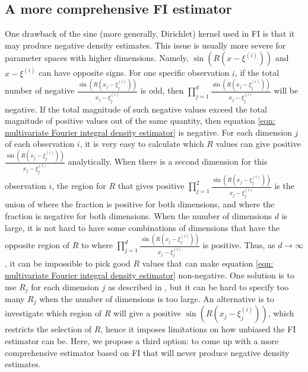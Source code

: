 \documentclass[%
 reprint,
 amsmath,amssymb,
 aps,
]{revtex4-2}
\begin{document}
\subsection{\label{subsec:comprehensive FI} A more comprehensive FI estimator}

One drawback of the sine (more generally, Dirichlet) kernel used in FI is that it may produce negative density estimates. This issue is usually more severe for parameter spaces with higher dimensions. Namely, $\sin(R(x - \xi^{(i)}))$ and $x - \xi^{(i)}$ can have opposite signs. For one specific observation $i$, if the total number of negative $\displaystyle \frac{\sin(R(x_j - \xi_j^{(i)}))}{x_j - \xi_j^{(i)}}$ is odd, then $\displaystyle \prod_{j = 1}^d \frac{\sin(R(x_j - \xi_j^{(i)}))}{x_j - \xi_j^{(i)}}$ will be negative. If the total magnitude of such negative values exceed the total magnitude of positive values out of the same quantity, then equation \eqref{eqn: multivariate Fourier integral density estimator} is negative. For each dimension $j$ of each observation $i$, it is very easy to calculate which $R$ values can give positive $\displaystyle \frac{\sin(R(x_j - \xi_j^{(i)}))}{x_j - \xi_j^{(i)}}$ analytically. When there is a second dimension for this observation $i$, the region for $R$ that gives positive $\displaystyle \prod_{j = 1}^2 \frac{\sin(R(x_j - \xi_j^{(i)}))}{x_j - \xi_j^{(i)}}$ is the union of where the fraction is positive for both dimensions, and where the fraction is negative for both dimensions. When the number of dimensions $d$ is large, it is not hard to have some combinations of dimensions that have the opposite region of $R$ to where $\displaystyle \prod_{j = 1}^d \frac{\sin(R(x_j - \xi_j^{(i)}))}{x_j - \xi_j^{(i)}}$ is positive. Thus, as $d \to \infty$, it can be impossible to pick good $R$ values that can make equation \eqref{eqn: multivariate Fourier integral density estimator} non-negative. One solution is to use $R_j$ for each dimension $j$ as described in \cite{rotiroti2022computing}, but it can be hard to specify too many $R_j$ when the number of dimensions is too large. An alternative is to investigate which region of $R$ will give a positive $\sin(R(x_j - \xi_j^{(i)}))$, which restricts the selection of $R$, hence it imposes limitations on how unbiased the FI estimator can be. Here, we propose a third option: to come up with a more comprehensive estimator based on FI that will never produce negative density estimates.
\end{document}

